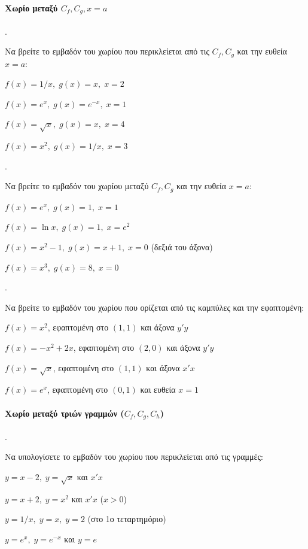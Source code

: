 \documentclass[11pt,a4paper,twocolumn]{article}
\newcounter{askhsh}
\newcommand{\askhsh}{\large\theaskhsh.\ \addtocounter{askhsh}{1}}
\begin{document}
\paragraph{Χωρίο μεταξύ $C_f,C_g,x=a$}
\askhsh Να βρείτε το εμβαδόν του χωρίου που περικλείεται από τις $C_f, C_g$ και την ευθεία $x=a$:
\begin{alist}
\item $f(x)=1/x, \; g(x)=x, \; x=2$
\item $f(x)=e^x, \; g(x)=e^{-x}, \; x=1$
\item $f(x)=\sqrt{x}, \; g(x)=x, \; x=4$
\item $f(x)=x^2, \; g(x)=1/x, \; x=3$
\end{alist}

\askhsh Να βρείτε το εμβαδόν του χωρίου μεταξύ $C_f, C_g$  και την ευθεία $x=a$:
\begin{alist}
\item $f(x)=e^x, \; g(x)=1, \; x=1$
\item $f(x)=\ln{x}, \; g(x)=1, \; x=e^2$
\item $f(x)=x^2-1, \; g(x)=x+1, \; x=0$ (δεξιά του άξονα)
\item $f(x)=x^3, \; g(x)=8, \; x=0$
\end{alist}

\askhsh Να βρείτε το εμβαδόν του χωρίου που ορίζεται από τις καμπύλες και την εφαπτομένη:
\begin{alist}
\item $f(x)=x^2$, εφαπτομένη στο $(1,1)$ και άξονα $y'y$
\item $f(x)=-x^2+2x$, εφαπτομένη στο $(2,0)$ και άξονα $y'y$
\item $f(x)=\sqrt{x}$, εφαπτομένη στο $(1,1)$ και άξονα $x'x$
\item $f(x)=e^x$, εφαπτομένη στο $(0,1)$ και ευθεία $x=1$
\end{alist}

\paragraph{Χωρίο μεταξύ τριών γραμμών ($C_f, C_g, C_h$)}
\askhsh Να υπολογίσετε το εμβαδόν του χωρίου που περικλείεται από τις γραμμές:
\begin{alist}
\item $y=x-2, \; y=\sqrt{x}$ και $x'x$
\item $y=x+2, \; y=x^2$ και $x'x$ ($x>0$)
\item $y=1/x, \; y=x, \; y=2$ (στο 1ο τεταρτημόριο)
\item $y=e^x, \; y=e^{-x}$ και $y=e$
\end{alist}
\end{document}
